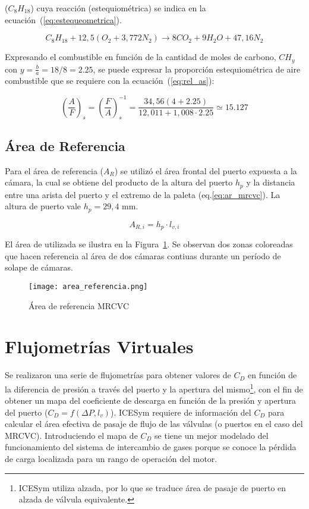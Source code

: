 ($C_{8}H_{18}$) cuya reacción (estequiométrica) se indica en la
ecuación~(\ref{eq:estequeometrica}).

\begin{equation} \label{eq:estequeometrica}
  C_{8}H_{18} + 12,5 \left(O_{2}+3,772N_{2}\right) \rightarrow 8 CO_{2} + 9 H_{2}O + 47,16 N_{2}
\end{equation}

Expresando el combustible en función de la cantidad de moles de carbono,
$CH_{y}$ con $y=\frac{b}{a}=18/8=2.25$, se puede expresar la proporción
estequiométrica de aire combustible que se requiere con la
ecuación~(\ref{eq:rel_as}):

\begin{equation} \label{eq:rel_as}
  \left(\frac{A}{F}\right)_{s} = \left(\frac{F}{A}\right)_{s}^{-1} = \frac{34,56(4+2.25)}{12,011 + 1,008\cdot 2.25} \simeq 15.127
\end{equation}

\subsection{Área de Referencia}
%
Para el área de referencia ($A_{R}$) se utilizó el área frontal del puerto
expuesta a la cámara, la cual se obtiene del producto de la altura del puerto
$h_{p}$ y la distancia entre una arista del puerto y el extremo de la paleta
(eq.\ref{eq:ar_mrcvc}).
%
La altura de puerto vale $h_{p}=29,4$ mm.

\begin{equation}\label{eq:ar_mrcvc} 
    A_{R,i} = h_{p} \cdot l_{v,i}
\end{equation}

El área de utilizada se ilustra en la Figura~\ref{fig:area_referencia}.
%
Se observan dos zonas coloreadas que hacen referencia al área de dos cámaras
contiuas durante un período de solape de cámaras.


\begin{figure}
  \centering
  \texttt{[image: area\_referencia.png]}
  \caption{Área de referencia MRCVC}\label{fig:area_referencia}
\end{figure}

\section{Flujometrías Virtuales}
%
Se realizaron una serie de flujometrías para obtener valores de $C_{D}$ en
función de la diferencia de presión a través del puerto y la apertura del
mismo\footnote{ICESym utiliza alzada, por lo que se traduce área de pasaje de
puerto en alzada de válvula equivalente.}, con el fin de obtener un mapa del
coeficiente de descarga en función de la presión y apertura del puerto
($C_{D} = f(\Delta P,l_v)$).
%
ICESym requiere de información del $C_{D}$ para calcular el área efectiva
de pasaje de flujo de las válvulas (o puertos en el caso del MRCVC).
%
Introduciendo el mapa de $C_{D}$ se tiene un mejor modelado del funcionamiento
del sistema de intercambio de gases porque se conoce la pérdida de carga
localizada para un rango de operación del motor.

